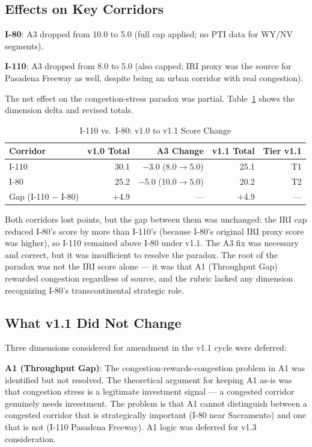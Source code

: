 \subsection{Effects on Key Corridors}

\textbf{I-80}: A3 dropped from 10.0 to 5.0 (full cap applied; no PTI data for WY/NV segments).

\textbf{I-110}: A3 dropped from 8.0 to 5.0 (also capped; IRI proxy was the source for Pasadena Freeway as well, despite being an urban corridor with real congestion).

The net effect on the congestion-stress paradox was partial. Table~\ref{tab:v11-delta} shows the dimension delta and revised totals.

\begin{table}[h!]
\centering
\caption{I-110 vs.\ I-80: v1.0 to v1.1 Score Change}
\label{tab:v11-delta}
\begin{tabular}{lrrrr}
\toprule
\textbf{Corridor} & \textbf{v1.0 Total} & \textbf{A3 Change} & \textbf{v1.1 Total} & \textbf{Tier v1.1} \\
\midrule
I-110 & 30.1 & $-$3.0 (8.0$\to$5.0) & 25.1 & T1 \\
I-80  & 25.2 & $-$5.0 (10.0$\to$5.0) & 20.2 & T2 \\
\midrule
Gap (I-110 $-$ I-80) & $+$4.9 & --- & $+$4.9 & --- \\
\bottomrule
\end{tabular}
\end{table}

Both corridors lost points, but the gap between them was unchanged: the IRI cap reduced I-80's score by more than I-110's (because I-80's original IRI proxy score was higher), so I-110 remained above I-80 under v1.1. The A3 fix was necessary and correct, but it was insufficient to resolve the paradox. The root of the paradox was not the IRI score alone --- it was that A1 (Throughput Gap) rewarded congestion regardless of source, and the rubric lacked any dimension recognizing I-80's transcontinental strategic role.

\subsection{What v1.1 Did Not Change}

Three dimensions considered for amendment in the v1.1 cycle were deferred:

\textbf{A1 (Throughput Gap)}: The congestion-rewards-congestion problem in A1 was identified but not resolved. The theoretical argument for keeping A1 as-is was that congestion stress is a legitimate investment signal --- a congested corridor genuinely needs investment. The problem is that A1 cannot distinguish between a congested corridor that is strategically important (I-80 near Sacramento) and one that is not (I-110 Pasadena Freeway). A1 logic was deferred for v1.3 consideration.


